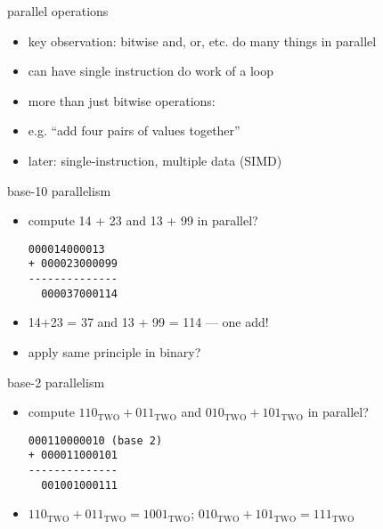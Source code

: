 \begin{frame}{parallel operations}
    \begin{itemize}
        \item key observation: bitwise and, or, etc. do many things in parallel
        \item can have single instruction do work of a loop
            \vspace{.5cm}
        \item more than just bitwise operations:
        \item e.g. ``add four pairs of values together''
        \item later: single-instruction, multiple data (SIMD)
    \end{itemize}
\end{frame}

\begin{frame}[fragile,label=base10par]{base-10 parallelism}
\begin{itemize}
\item compute 14 + 23 and 13 + 99 in parallel?
\begin{lstlisting}[language={}]
  000014000013
+ 000023000099
--------------
  000037000114
\end{lstlisting}
\item 14+23 = 37 and 13 + 99 = 114 --- one add!
\item apply same principle in binary?
\end{itemize}
\end{frame}

\begin{frame}[fragile,label=base2par]{base-2 parallelism}
\begin{itemize}
\item compute $110_\text{TWO} + 011_\text{TWO}$ and $010_\text{TWO} + 101_\text{TWO}$ in parallel?
\begin{lstlisting}[language={}]
  000110000010 (base 2)
+ 000011000101
--------------
  001001000111
\end{lstlisting}
\item $110_\text{TWO} + 011_\text{TWO} = 1001_\text{TWO}$; $010_\text{TWO} + 101_\text{TWO} = 111_\text{TWO}$
\end{itemize}
\end{frame}
